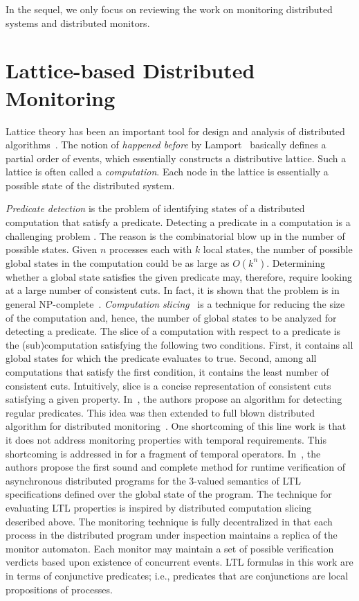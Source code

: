 In the sequel, we only focus on reviewing the work on monitoring distributed 
systems and distributed monitors.

\section{Lattice-based Distributed Monitoring}

Lattice theory has been an important tool for design and analysis of 
distributed algorithms~\cite{g02}. The notion of {\em happened before} by 
Lamport~\cite{lamport} basically defines a partial order of events, which 
essentially constructs a distributive lattice. Such a lattice is often called a 
{\em computation}. Each node in the lattice is essentially a possible state of 
the distributed system.

{\em Predicate detection} is the problem of identifying states of a distributed 
computation that satisfy a predicate. Detecting a predicate in a computation is 
a challenging problem \cite{g02,ss95}. The reason is the combinatorial blow up 
in the number of possible states. Given $n$ processes each with $k$ local 
states, the number of possible global states in the computation could be as 
large as $O(k^n)$. Determining whether a global state satisfies the given predicate may,
therefore, require looking at a large number of consistent cuts. In fact, it is shown that the problem is in general NP-complete~\cite{mg01}. {\em Computation slicing}~\cite{mg05} is a technique for reducing the size of the computation and, hence, the
number of global states to be analyzed for detecting a predicate. The slice of a computation with respect to a predicate is the (sub)computation satisfying the following two conditions. First, it contains all global states for which the predicate evaluates to true. Second, among all computations that satisfy the first condition, it contains the least number of consistent cuts. Intuitively, slice is a concise representation of consistent cuts satisfying a given property. In~\cite{mg05}, the authors propose an algorithm for detecting regular predicates. This idea was then extended to full blown distributed algorithm for distributed monitoring~\cite{cgnm13}. One shortcoming of this line work is that it does not address monitoring properties with temporal requirements. This shortcoming is addressed in \cite{og07} for a fragment of temporal operators. In~\cite{mb15}, the authors propose the first sound and complete method for runtime verification of asynchronous distributed programs for the 3-valued semantics of LTL specifications defined over the global state of the program. The technique for evaluating LTL properties is inspired by distributed computation slicing described above. The monitoring technique is fully decentralized in that each process in the distributed program under inspection maintains a replica of the
monitor automaton. Each monitor may maintain a set of possible verification verdicts based upon existence of concurrent events. LTL formulas in this work are in terms of conjunctive predicates; i.e., predicates that are conjunctions are local propositions of processes.

